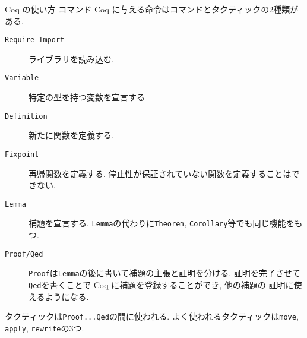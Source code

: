 \documentclass[dvipdfmx,cjk]{beamer}
\theoremstyle{mystyle}
\newcommand{\0}{\textbf{0}}
\begin{document}
\begin{frame}{Coq の使い方 コマンド}
  Coq に与える命令はコマンドとタクティックの2種類がある. \pause
	\begin{description}
	  \item[\tt Require Import] ライブラリを読み込む.
	  \item[\tt Variable] 特定の型を持つ変数を宣言する
	  \item[\tt Definition] 新たに関数を定義する.
	  \item[\tt Fixpoint] 再帰関数を定義する. 
	  	停止性が保証されていない関数を定義することはできない.
	  \item[\tt Lemma] 補題を宣言する. 
	    {\tt Lemma}の代わりに{\tt Theorem}, {\tt Corollary}等でも同じ機能をもつ. 
	  \item[\tt Proof/Qed]
	    {\tt Proof}は{\tt Lemma}の後に書いて補題の主張と証明を分ける.  
	    証明を完了させて{\tt Qed}を書くことで Coq に補題を登録することができ, 他の補題の
	    証明に使えるようになる. 
	\end{description} \pause
	タクティックは{\tt Proof...Qed}の間に使われる. 
	よく使われるタクティックは{\tt move}, {\tt apply}, {\tt rewrite}の3つ.
\end{frame}
\end{document}

